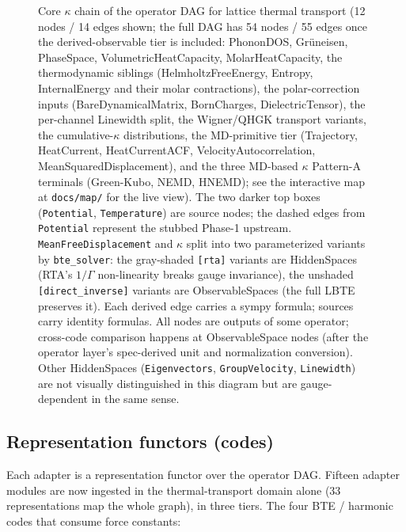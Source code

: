 \documentclass[11pt,a4paper]{article}
\begin{document}
\begin{figure}[t]
{\begin{tikzpicture}
\end{tikzpicture}%
}
\caption{Core $\kappa$ chain of the operator DAG for lattice thermal transport
(12 nodes / 14 edges shown; the full DAG has 54 nodes / 55 edges once the
derived-observable tier is included: PhononDOS, Grüneisen, PhaseSpace, VolumetricHeatCapacity,
MolarHeatCapacity, the thermodynamic siblings (HelmholtzFreeEnergy, Entropy,
InternalEnergy and their molar contractions), the polar-correction inputs
(BareDynamicalMatrix, BornCharges, DielectricTensor), the per-channel
Linewidth split, the Wigner/QHGK transport variants, the cumulative-$\kappa$
distributions, the MD-primitive tier (Trajectory, HeatCurrent, HeatCurrentACF,
VelocityAutocorrelation, MeanSquaredDisplacement), and the three MD-based
$\kappa$ Pattern-A terminals (Green-Kubo, NEMD, HNEMD); see
the interactive map at \texttt{docs/map/} for the live view). The
two darker top boxes (\texttt{Potential}, \texttt{Temperature}) are source nodes;
the dashed edges from \texttt{Potential} represent the stubbed Phase-1 upstream.
\texttt{MeanFreeDisplacement} and $\kappa$ split into two parameterized variants by
\texttt{bte\_solver}: the gray-shaded \texttt{[rta]} variants are HiddenSpaces
(RTA's $1/\Gamma$ non-linearity breaks gauge invariance), the unshaded
\texttt{[direct\_inverse]} variants are ObservableSpaces (the full LBTE preserves it).
Each derived edge carries a sympy formula; sources carry identity formulas. All
nodes are outputs of some operator; cross-code comparison happens at ObservableSpace
nodes (after the operator layer's spec-derived unit and normalization conversion). Other
HiddenSpaces (\texttt{Eigenvectors}, \texttt{GroupVelocity}, \texttt{Linewidth})
are not visually distinguished in this diagram but are gauge-dependent in the same
sense.}
\label{fig:dag}
\end{figure}

\subsection{Representation functors (codes)}

Each adapter is a representation functor over the operator DAG. Fifteen
adapter modules are now ingested in the thermal-transport domain alone (33
representations map the whole graph), in three tiers. The four BTE / harmonic codes that consume
force constants:
\end{document}
